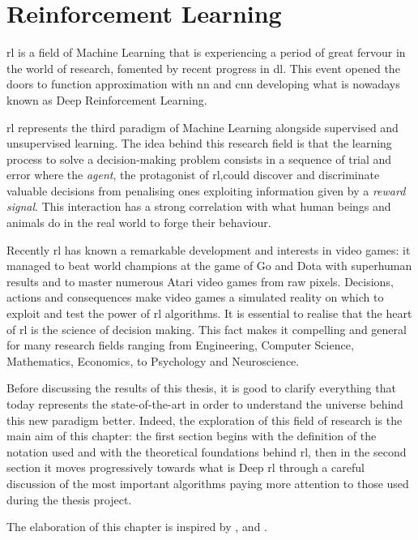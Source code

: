 
\chapter{Reinforcement Learning}

\acrfull{rl} is a field of Machine Learning that is experiencing a period of great fervour in the world of research, fomented by recent progress in \acrfull{dl}. This event opened the doors to function approximation with \acrfull{nn} and \acrfull{cnn} developing what is nowadays known as Deep Reinforcement Learning.

\acrshort{rl} represents the third paradigm of Machine Learning alongside supervised and unsupervised learning. The idea behind  this research field is that the learning process to solve a decision-making problem consists in a sequence of trial and error where the \textit{agent}, the protagonist of \acrshort{rl},could discover and discriminate valuable decisions from penalising ones exploiting information given by a \textit{reward signal}. This interaction has a strong correlation with what human beings and animals do in the real world to forge their behaviour.

Recently \acrshort{rl} has known a remarkable development and interests in video games: it managed to beat world champions at the game of Go \cite{silver2016mastering} and Dota with superhuman results and to master numerous Atari video games \cite{mnih2013playing} from raw pixels. Decisions, actions and consequences make video games a simulated reality on which to exploit and test the power of \acrshort{rl} algorithms.
It is essential to realise that the heart of \acrshort{rl} is the science of decision making. This fact makes it compelling and general for many research fields ranging from Engineering, Computer Science, Mathematics, Economics, to Psychology and Neuroscience.

Before discussing the results of this thesis, it is good to clarify everything that today represents the state-of-the-art in order to understand the universe behind this new paradigm better. Indeed, the exploration of this field of research is the main aim of this chapter: the first section begins with the definition of the notation used and with the theoretical foundations behind \acrshort{rl}, then in the second section it moves  progressively towards what is Deep \acrshort{rl} through a careful discussion of the most important algorithms paying more attention to those used during the thesis project.

The elaboration of this chapter is inspired by \cite{silver2015lectures}, \cite{sutton2018reinforcement} and \cite{openai2018spinningup}.

